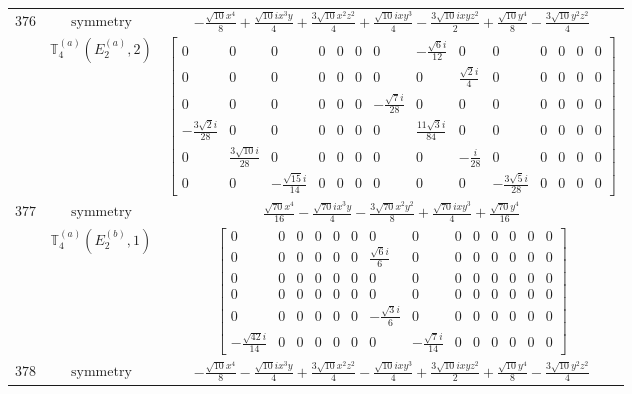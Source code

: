 \documentclass[fleqn,8pt,landscape]{jsarticle}
\begin{document}
\begin{longtable}{ccc}
$ 376 $ & $ \text{symmetry} $ & $ - \frac{\sqrt{10} x^{4}}{8} + \frac{\sqrt{10} i x^{3} y}{4} + \frac{3 \sqrt{10} x^{2} z^{2}}{4} + \frac{\sqrt{10} i x y^{3}}{4} - \frac{3 \sqrt{10} i x y z^{2}}{2} + \frac{\sqrt{10} y^{4}}{8} - \frac{3 \sqrt{10} y^{2} z^{2}}{4} $ \\
$  $ & $ \mathbb{T}_{4}^{(a)}(E_{2}^{(a)},2) $ & $ \begin{bmatrix} 0 & 0 & 0 & 0 & 0 & 0 & 0 & - \frac{\sqrt{6} i}{12} & 0 & 0 & 0 & 0 & 0 & 0 \\ 0 & 0 & 0 & 0 & 0 & 0 & 0 & 0 & \frac{\sqrt{2} i}{4} & 0 & 0 & 0 & 0 & 0 \\ 0 & 0 & 0 & 0 & 0 & 0 & - \frac{\sqrt{7} i}{28} & 0 & 0 & 0 & 0 & 0 & 0 & 0 \\ - \frac{3 \sqrt{2} i}{28} & 0 & 0 & 0 & 0 & 0 & 0 & \frac{11 \sqrt{3} i}{84} & 0 & 0 & 0 & 0 & 0 & 0 \\ 0 & \frac{3 \sqrt{10} i}{28} & 0 & 0 & 0 & 0 & 0 & 0 & - \frac{i}{28} & 0 & 0 & 0 & 0 & 0 \\ 0 & 0 & - \frac{\sqrt{15} i}{14} & 0 & 0 & 0 & 0 & 0 & 0 & - \frac{3 \sqrt{5} i}{28} & 0 & 0 & 0 & 0 \end{bmatrix} $ \\ \hline
$ 377 $ & $ \text{symmetry} $ & $ \frac{\sqrt{70} x^{4}}{16} - \frac{\sqrt{70} i x^{3} y}{4} - \frac{3 \sqrt{70} x^{2} y^{2}}{8} + \frac{\sqrt{70} i x y^{3}}{4} + \frac{\sqrt{70} y^{4}}{16} $ \\
$  $ & $ \mathbb{T}_{4}^{(a)}(E_{2}^{(b)},1) $ & $ \begin{bmatrix} 0 & 0 & 0 & 0 & 0 & 0 & 0 & 0 & 0 & 0 & 0 & 0 & 0 & 0 \\ 0 & 0 & 0 & 0 & 0 & 0 & \frac{\sqrt{6} i}{6} & 0 & 0 & 0 & 0 & 0 & 0 & 0 \\ 0 & 0 & 0 & 0 & 0 & 0 & 0 & 0 & 0 & 0 & 0 & 0 & 0 & 0 \\ 0 & 0 & 0 & 0 & 0 & 0 & 0 & 0 & 0 & 0 & 0 & 0 & 0 & 0 \\ 0 & 0 & 0 & 0 & 0 & 0 & - \frac{\sqrt{3} i}{6} & 0 & 0 & 0 & 0 & 0 & 0 & 0 \\ - \frac{\sqrt{42} i}{14} & 0 & 0 & 0 & 0 & 0 & 0 & - \frac{\sqrt{7} i}{14} & 0 & 0 & 0 & 0 & 0 & 0 \end{bmatrix} $ \\ \hline
$ 378 $ & $ \text{symmetry} $ & $ - \frac{\sqrt{10} x^{4}}{8} - \frac{\sqrt{10} i x^{3} y}{4} + \frac{3 \sqrt{10} x^{2} z^{2}}{4} - \frac{\sqrt{10} i x y^{3}}{4} + \frac{3 \sqrt{10} i x y z^{2}}{2} + \frac{\sqrt{10} y^{4}}{8} - \frac{3 \sqrt{10} y^{2} z^{2}}{4} $ \\

\end{longtable}
\end{document}
